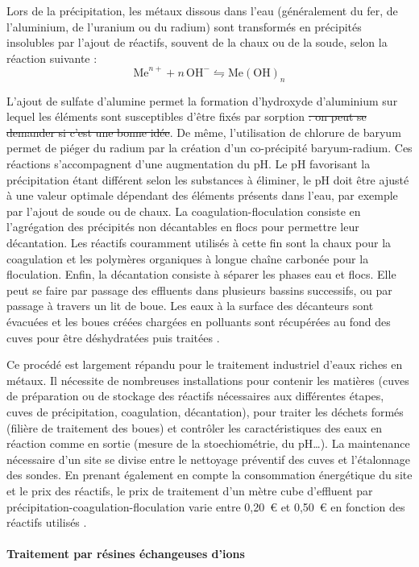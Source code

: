 \documentclass{article}
\begin{document}
Lors de la précipitation, les métaux dissous dans l’eau (généralement du fer, de l'aluminium, de l'uranium ou du radium) sont transformés en précipités insolubles par l’ajout de réactifs, souvent de la chaux ou de la soude, selon la réaction suivante :   
$$\mathrm{Me}^{n+} + n \, \mathrm{OH}^- \leftrightharpoons \mathrm{Me(OH)}_{n}$$
          	
L’ajout de sulfate d’alumine permet la formation d’hydroxyde d’aluminium sur lequel les éléments sont susceptibles d'être fixés par sorption\sout{ : on peut se demander si c'est une bonne idée}. De même, l’utilisation de chlorure de baryum permet de piéger du radium par la création d’un co-précipité baryum-radium. Ces réactions s’accompagnent d’une augmentation du pH. Le pH favorisant la précipitation étant différent selon les substances à éliminer, le pH doit être ajusté à une valeur optimale dépendant des éléments présents dans l'eau, par exemple par l’ajout de soude ou de chaux. La coagulation-floculation consiste en l’agrégation des précipités non décantables en flocs  pour permettre leur décantation. Les réactifs couramment utilisés à cette fin sont la chaux pour la coagulation et les polymères organiques à longue chaîne carbonée pour la floculation. Enfin, la décantation consiste à séparer les phases eau et flocs. Elle peut se faire par passage des effluents dans plusieurs bassins successifs, ou par passage à travers un lit de boue. Les eaux à la surface des décanteurs sont évacuées et les boues créées chargées en polluants sont récupérées au fond des cuves pour être déshydratées puis traitées \cite{colombano_quelles_2010}.

Ce procédé est largement répandu pour le traitement industriel d’eaux riches en métaux. Il nécessite de nombreuses installations pour contenir les matières (cuves de préparation ou de stockage des réactifs nécessaires aux différentes étapes, cuves de précipitation, coagulation, décantation), pour traiter les déchets formés (filière de traitement des boues) et contrôler les caractéristiques des eaux en réaction comme en sortie (mesure de la stoechiométrie, du pH…). La maintenance nécessaire d'un site se divise entre le nettoyage préventif des cuves et l'étalonnage des sondes. En prenant également en compte la consommation énergétique du site et le prix des réactifs, le prix de traitement d’un mètre cube d’effluent par précipitation-coagulation-floculation varie entre 0,20~\euro{} et 0,50~\euro{} en fonction des réactifs utilisés \cite{schick_informations_2020}.

\paragraph{Traitement par résines échangeuses d’ions} \hspace{1 em}
\end{document}
